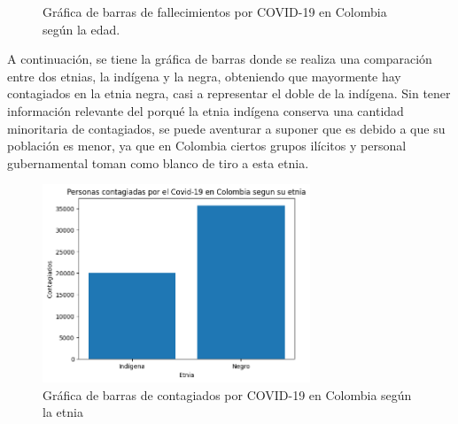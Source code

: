 \documentclass[conference,compsoc,onecolumn]{IEEEtran}
\begin{document}
\begin{figure}[htbp]
\centering
{}
\caption{Gráfica de barras de fallecimientos por COVID-19 en Colombia según la edad.} 
\label{fig:lego}
\end{figure}

A continuación, se tiene la gráfica de barras donde se realiza una comparación entre dos etnias, la indígena y la negra, obteniendo que mayormente hay contagiados en la etnia negra, casi a representar el doble de la indígena. Sin tener información relevante del porqué la etnia indígena conserva una cantidad minoritaria de contagiados, se puede aventurar a suponer que es debido a que su población es menor, ya que en Colombia ciertos grupos ilícitos y personal gubernamental toman como blanco de tiro a esta etnia.

\begin{figure}[H]
\centering
\includegraphics[width=8cm]{./images/GraficoBarras_Etnia_Contagios.png}
\caption{Gráfica de barras de contagiados por COVID-19 en Colombia según la etnia}
\label{fig:mesh1}
\end{figure}
\end{document}
